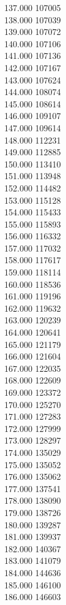 { 137.000	107005 \\
 138.000	107039 \\
 139.000	107072 \\
 140.000	107106 \\
 141.000	107136 \\
 142.000	107167 \\
 143.000	107624 \\
 144.000	108074 \\
 145.000	108614 \\
 146.000	109107 \\
 147.000	109614 \\
 148.000	112231 \\
 149.000	112885 \\
 150.000	113410 \\
 151.000	113948 \\
 152.000	114482 \\
 153.000	115128 \\
 154.000	115433 \\
 155.000	115893 \\
 156.000	116332 \\
 157.000	117032 \\
 158.000	117617 \\
 159.000	118114 \\
 160.000	118536 \\
 161.000	119196 \\
 162.000	119632 \\
 163.000	120239 \\
 164.000	120641 \\
 165.000	121179 \\
 166.000	121604 \\
 167.000	122035 \\
 168.000	122609 \\
 169.000	123372 \\
 170.000	125270 \\
 171.000	127283 \\
 172.000	127999 \\
 173.000	128297 \\
 174.000	135029 \\
 175.000	135052 \\
 176.000	135062 \\
 177.000	137541 \\
 178.000	138090 \\
 179.000	138726 \\
 180.000	139287 \\
 181.000	139937 \\
 182.000	140367 \\
 183.000	141079 \\
 184.000	144636 \\
 185.000	146100 \\
 186.000	146603 \\
}
